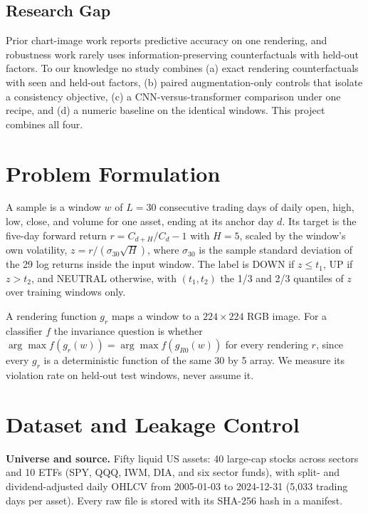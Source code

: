 \documentclass[10pt,journal,compsoc]{IEEEtran}
\begin{document}
\subsection{Research Gap}
Prior chart-image work reports predictive accuracy on one rendering, and robustness work rarely uses information-preserving counterfactuals with held-out factors. To our knowledge no study combines (a) exact rendering counterfactuals with seen and held-out factors, (b) paired augmentation-only controls that isolate a consistency objective, (c) a CNN-versus-transformer comparison under one recipe, and (d) a numeric baseline on the identical windows. This project combines all four.

\section{Problem Formulation}\label{sec:problem}
A sample is a window $w$ of $L = 30$ consecutive trading days of daily open, high, low, close, and volume for one asset, ending at its anchor day $d$. Its target is the five-day forward return $r = C_{d+H}/C_d - 1$ with $H = 5$, scaled by the window's own volatility, $z = r/(\sigma_{30}\sqrt{H})$, where $\sigma_{30}$ is the sample standard deviation of the 29 log returns inside the input window. The label is DOWN if $z \le t_1$, UP if $z > t_2$, and NEUTRAL otherwise, with $(t_1, t_2)$ the 1/3 and 2/3 quantiles of $z$ over training windows only.

A rendering function $g_r$ maps a window to a $224 \times 224$ RGB image. For a classifier $f$ the invariance question is whether $\arg\max f(g_r(w)) = \arg\max f(g_{R0}(w))$ for every rendering $r$, since every $g_r$ is a deterministic function of the same 30 by 5 array. We measure its violation rate on held-out test windows, never assume it.

\section{Dataset and Leakage Control}\label{sec:data}
\textbf{Universe and source.} Fifty liquid US assets: 40 large-cap stocks across sectors and 10 ETFs (SPY, QQQ, IWM, DIA, and six sector funds), with split- and dividend-adjusted daily OHLCV from 2005-01-03 to 2024-12-31 (5{,}033 trading days per asset). Every raw file is stored with its SHA-256 hash in a manifest.
\end{document}
